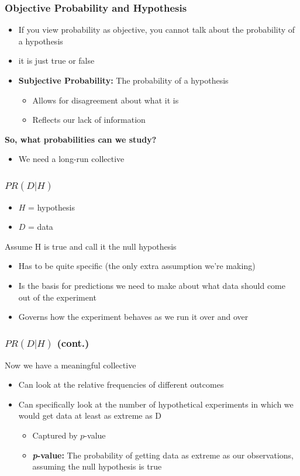 \documentclass[12pt, block=fill]{beamer}
\begin{document}
\begin{frame}
  \frametitle{Objective Probability and Hypothesis}
  \begin{itemize}
    \item If you view probability as objective, you cannot talk about the probability of a hypothesis
    \item it is just true or false
    \item \textbf{Subjective Probability:} The probability of a hypothesis
    \begin{itemize}
        \item Allows for disagreement about what it is
        \item Reflects our lack of information
    \end{itemize}
  \end{itemize}

  \textbf{So, what probabilities can we study?}

  \begin{itemize}
    \item We need a long-run collective
  \end{itemize}
\end{frame}

\begin{frame}
  \frametitle{$PR(D|H)$}
  \begin{itemize}
    \item $H$ = hypothesis
    \item $D$ = data
  \end{itemize}

  Assume H is true and call it the null hypothesis

  \begin{itemize}
    \item Has to be quite specific (the only extra assumption we're making)
    \item Is the basis for predictions we need to make about what data should come out of the experiment
    \item Governs how the experiment behaves as we run it over and over
  \end{itemize}
\end{frame}

\begin{frame}
  \frametitle{$PR(D|H)$ (cont.)}
  Now we have a meaningful collective
  \begin{itemize}
    \item Can look at the relative frequencies of different outcomes
    \item Can specifically look at the number of hypothetical experiments in which we would get data at least as extreme as D
    \begin{itemize}
        \item Captured by $p$-value
        \item \textbf{\textit{p}-value:} The probability of getting data as extreme as our observations, assuming the null hypothesis is true
    \end{itemize}
  \end{itemize}
\end{frame}
\end{document}
